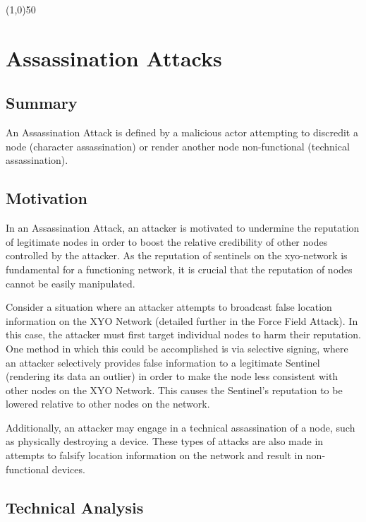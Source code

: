 \documentclass{article}
\begin{document}
\begin{center}
\line(1,0){50}
\end{center}

\section{Assassination Attacks}

\subsection{Summary}

An Assassination Attack is defined by a malicious actor attempting to discredit a node (character assassination) or render another node non-functional (technical assassination).

\subsection{Motivation}

In an Assassination Attack, an attacker is motivated to undermine the reputation of legitimate nodes in order to boost the relative credibility of other nodes controlled by the attacker. As the reputation of \Glspl{sentinel} on the \Gls{xyo-network} is fundamental for a functioning network, it is crucial that the reputation of nodes cannot be easily manipulated.

Consider a situation where an attacker attempts to broadcast false location information on the XYO Network (detailed further in the Force Field Attack). In this case, the attacker must first target individual nodes to harm their reputation. One method in which this could be accomplished is via selective signing, where an attacker selectively provides false information to a legitimate Sentinel (rendering its data an outlier) in order to make the node less consistent with other nodes on the XYO Network. This causes the Sentinel's reputation to be lowered relative to other nodes on the network.

Additionally, an attacker may engage in a technical assassination of a node, such as physically destroying a device. These types of attacks are also made in attempts to falsify location information on the network and result in non-functional devices.

\subsection{Technical Analysis}
\end{document}
